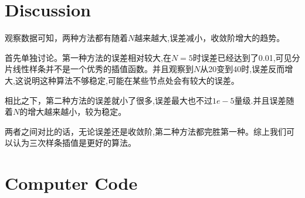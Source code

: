 \documentclass{article}
\begin{document}
	\section{Discussion}
	
	观察数据可知，两种方法都有随着$N$越来越大,误差减小，收敛阶增大的趋势。
	
	首先单独讨论。第一种方法的误差相对较大,在$N=5$时误差已经达到了0.01,可见分片线性样条并不是一个优秀的插值函数。并且观察到$N$从20变到40时,误差反而增大,这说明这种算法不够稳定,可能在某些节点处会有较大的误差。
	
	相比之下，第二种方法的误差就小了很多,误差最大也不过$1e-5$量级.并且误差随着$N$的增大越来越小，较为稳定。
	
	两者之间对比的话，无论误差还是收敛阶,第二种方法都完胜第一种。综上我们可以认为三次样条插值是更好的算法。
	
	\section{Computer Code}
	
	
	
	
	
\end{document}
